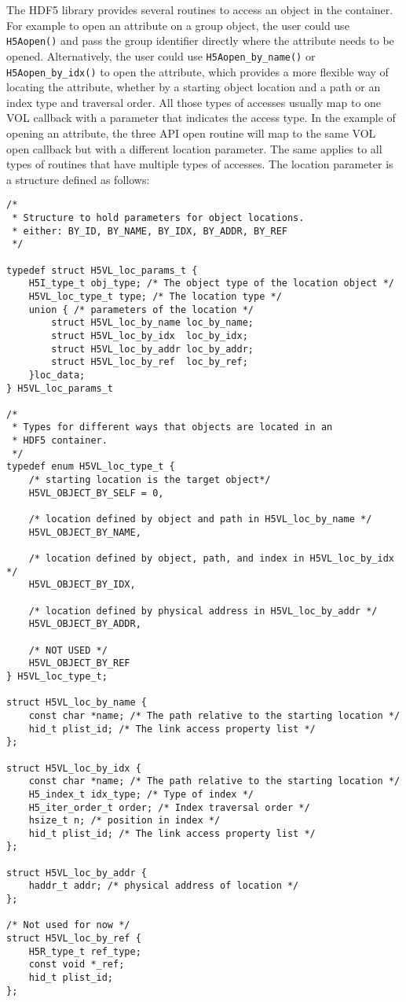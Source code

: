 The HDF5 library provides several routines to access an object in the
container. For example to open an attribute on a group object, the
user could use {\tt H5Aopen()} and pass the group identifier directly
where the attribute needs to be opened. Alternatively, the user could
use {\tt H5Aopen\_by\_name()} or {\tt H5Aopen\_by\_idx()} to open the
attribute, which provides a more flexible way of locating the
attribute, whether by a starting object location and a path or an
index type and traversal order. All those types of accesses usually
map to one VOL callback with a parameter that indicates the access
type. In the example of opening an attribute, the three API open
routine will map to the same VOL open callback but with a different
location parameter. The same applies to all types of routines that
have multiple types of accesses.  The location parameter is a
structure defined as follows:

\begin{lstlisting}
/* 
 * Structure to hold parameters for object locations.
 * either: BY_ID, BY_NAME, BY_IDX, BY_ADDR, BY_REF 
 */

typedef struct H5VL_loc_params_t {
    H5I_type_t obj_type; /* The object type of the location object */
    H5VL_loc_type_t type; /* The location type */
    union { /* parameters of the location */
        struct H5VL_loc_by_name loc_by_name;
        struct H5VL_loc_by_idx  loc_by_idx;
        struct H5VL_loc_by_addr loc_by_addr;
        struct H5VL_loc_by_ref  loc_by_ref;
    }loc_data;
} H5VL_loc_params_t

/* 
 * Types for different ways that objects are located in an 
 * HDF5 container.
 */
typedef enum H5VL_loc_type_t {
    /* starting location is the target object*/
    H5VL_OBJECT_BY_SELF = 0, 

    /* location defined by object and path in H5VL_loc_by_name */
    H5VL_OBJECT_BY_NAME, 

    /* location defined by object, path, and index in H5VL_loc_by_idx */
    H5VL_OBJECT_BY_IDX,

    /* location defined by physical address in H5VL_loc_by_addr */
    H5VL_OBJECT_BY_ADDR,

    /* NOT USED */
    H5VL_OBJECT_BY_REF
} H5VL_loc_type_t;

struct H5VL_loc_by_name {
    const char *name; /* The path relative to the starting location */
    hid_t plist_id; /* The link access property list */
};

struct H5VL_loc_by_idx {
    const char *name; /* The path relative to the starting location */
    H5_index_t idx_type; /* Type of index */
    H5_iter_order_t order; /* Index traversal order */
    hsize_t n; /* position in index */
    hid_t plist_id; /* The link access property list */
};

struct H5VL_loc_by_addr {
    haddr_t addr; /* physical address of location */
};

/* Not used for now */
struct H5VL_loc_by_ref {
    H5R_type_t ref_type;
    const void *_ref;
    hid_t plist_id;
};
\end{lstlisting}

